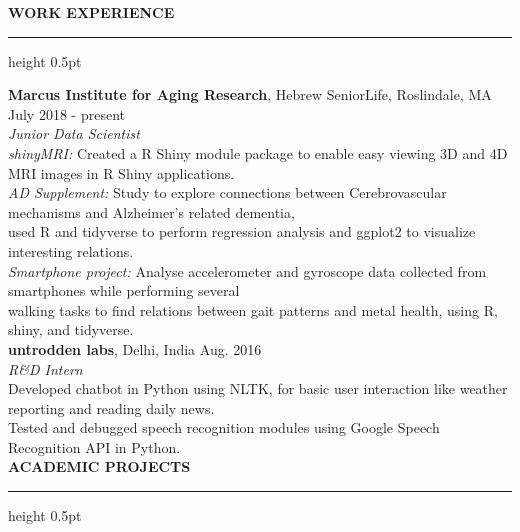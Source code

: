 \documentclass[a4paper]{article}
\newcommand{\myline}{\par
  \kern2pt %
  \hrule height 0.5pt
  \kern2pt %
}
\newcommand{\mybullet}{
	\indent \textbullet \hspace*{2mm}
}
\begin{document}
	\smallskip
	\smallskip
	\noindent
	{\large \textbf{WORK EXPERIENCE}}
	\myline 
	\smallskip
	
  \noindent
  \textbf{Marcus Institute for Aging Research}, Hebrew SeniorLife, Roslindale, MA 
  \hfill July 2018 - present\\
        \textit{Junior Data Scientist} \\
        \mybullet \textit{shinyMRI:} Created a R Shiny module package to enable easy viewing 3D 
				and 4D MRI images in R Shiny applications. \\
				\mybullet \textit{AD Supplement:} Study to explore connections between Cerebrovascular 
				mechanisms and Alzheimer's related dementia, \\ \hspace*{9mm} used R and tidyverse to 
				perform regression analysis and ggplot2 to visualize interesting relations. \\
				\mybullet \textit{Smartphone project:} Analyse accelerometer and gyroscope data collected 
				from smartphones while performing several \\ \hspace*{9mm} walking tasks to find 
				relations between gait patterns and metal health, using R, shiny, and tidyverse. \\

	\noindent
	\textbf{untrodden labs}, Delhi, India \hfill Aug. 2016 \\
        \textit{R\&D Intern}\\
        \mybullet Developed chatbot in Python using NLTK, for basic user interaction like 
        weather reporting and reading daily news. \\
        \mybullet Tested and debugged speech recognition modules using Google Speech 
        Recognition API in Python. \\
	
	
\noindent
{\large \textbf{ACADEMIC PROJECTS}}
\myline 
\smallskip
\end{document}
